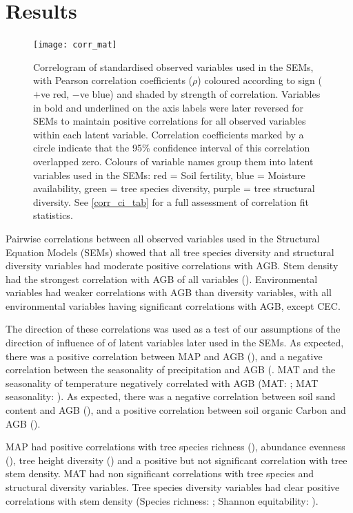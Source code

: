 \documentclass[11pt,a4paper]{article}
\begin{document}
\section{Results}

\begin{figure}[H]
\centering
	\texttt{[image: corr\_mat]}
	\caption{Correlogram of standardised observed variables used in the SEMs, with Pearson correlation coefficients ($\rho$) coloured according to sign ($+$ve red, $-$ve blue) and shaded by strength of correlation. Variables in bold and underlined on the axis labels were later reversed for SEMs to maintain positive correlations for all observed variables within each latent variable. Correlation coefficients marked by a circle indicate that the 95\% confidence interval of this correlation overlapped zero. Colours of variable names group them into latent variables used in the SEMs: red = Soil fertility, blue = Moisture availability, green = tree species diversity, purple = tree structural diversity. See \autoref{corr_ci_tab} for a full assessment of correlation fit statistics.}
	\label{corr_mat}
\end{figure}

Pairwise correlations between all observed variables used in the Structural Equation Models (SEMs) showed that all tree species diversity and structural diversity variables had moderate positive correlations with AGB. Stem density had the strongest correlation with AGB of all variables (\ccib{}). Environmental variables had weaker correlations with AGB than diversity variables, with all environmental variables having significant correlations with AGB, except CEC.

The direction of these correlations was used as a test of our assumptions of the direction of influence of of latent variables later used in the SEMs. As expected, there was a positive correlation between MAP and AGB (\ccmb{}), and a negative correlation between the seasonality of precipitation and AGB (\ccmcb{}. MAT and the seasonality of temperature negatively correlated with AGB (MAT: \cctb{}; MAT seasonality: \cctcb{}). As expected, there was a negative correlation between soil sand content and AGB (\ccsb{}), and a positive correlation between soil organic Carbon and AGB (\ccob{}).

MAP had positive correlations with tree species richness (\ccms{}), abundance evenness (\ccme{}), tree height diversity (\ccmh{}) and a positive but not significant correlation with tree stem density. MAT had non significant correlations with tree species and structural diversity variables. Tree species diversity variables had clear positive correlations with stem density (Species richness: \ccsi{}; Shannon equitability: \ccei{}). 
\end{document}
